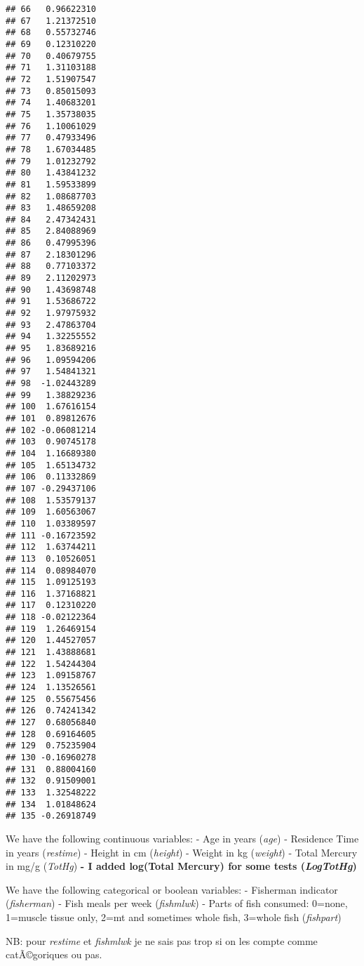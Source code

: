 \documentclass[12pt,]{article}
\newenvironment{Shaded}{\begin{snugshade}}{\end{snugshade}}
\newcommand{\KeywordTok}[1]{\textcolor[rgb]{0.13,0.29,0.53}{\textbf{#1}}}
\newcommand{\StringTok}[1]{\textcolor[rgb]{0.31,0.60,0.02}{#1}}
\newcommand{\CommentTok}[1]{\textcolor[rgb]{0.56,0.35,0.01}{\textit{#1}}}
\newcommand{\OperatorTok}[1]{\textcolor[rgb]{0.81,0.36,0.00}{\textbf{#1}}}
\newcommand{\NormalTok}[1]{#1}
\begin{document}
\begin{verbatim}
## 66   0.96622310
## 67   1.21372510
## 68   0.55732746
## 69   0.12310220
## 70   0.40679755
## 71   1.31103188
## 72   1.51907547
## 73   0.85015093
## 74   1.40683201
## 75   1.35738035
## 76   1.10061029
## 77   0.47933496
## 78   1.67034485
## 79   1.01232792
## 80   1.43841232
## 81   1.59533899
## 82   1.08687703
## 83   1.48659208
## 84   2.47342431
## 85   2.84088969
## 86   0.47995396
## 87   2.18301296
## 88   0.77103372
## 89   2.11202973
## 90   1.43698748
## 91   1.53686722
## 92   1.97975932
## 93   2.47863704
## 94   1.32255552
## 95   1.83689216
## 96   1.09594206
## 97   1.54841321
## 98  -1.02443289
## 99   1.38829236
## 100  1.67616154
## 101  0.89812676
## 102 -0.06081214
## 103  0.90745178
## 104  1.16689380
## 105  1.65134732
## 106  0.11332869
## 107 -0.29437106
## 108  1.53579137
## 109  1.60563067
## 110  1.03389597
## 111 -0.16723592
## 112  1.63744211
## 113  0.10526051
## 114  0.08984070
## 115  1.09125193
## 116  1.37168821
## 117  0.12310220
## 118 -0.02122364
## 119  1.26469154
## 120  1.44527057
## 121  1.43888681
## 122  1.54244304
## 123  1.09158767
## 124  1.13526561
## 125  0.55675456
## 126  0.74241342
## 127  0.68056840
## 128  0.69164605
## 129  0.75235904
## 130 -0.16960278
## 131  0.88004160
## 132  0.91509001
## 133  1.32548222
## 134  1.01848624
## 135 -0.26918749
\end{verbatim}

We have the following continuous variables: - Age in years (\emph{age})
- Residence Time in years (\emph{restime}) - Height in cm
(\emph{height}) - Weight in kg (\emph{weight}) - Total Mercury in mg/g
(\emph{TotHg}) \textbf{- I added log(Total Mercury) for some tests
(\emph{LogTotHg})}

We have the following categorical or boolean variables: - Fisherman
indicator (\emph{fisherman}) - Fish meals per week (\emph{fishmlwk}) -
Parts of fish consumed: 0=none, 1=muscle tissue only, 2=mt and sometimes
whole fish, 3=whole fish (\emph{fishpart})

NB: pour \emph{restime} et \emph{fishmlwk} je ne sais pas trop si on les
compte comme catÃ©goriques ou pas.

\begin{Shaded}
\end{Shaded}
\end{document}
